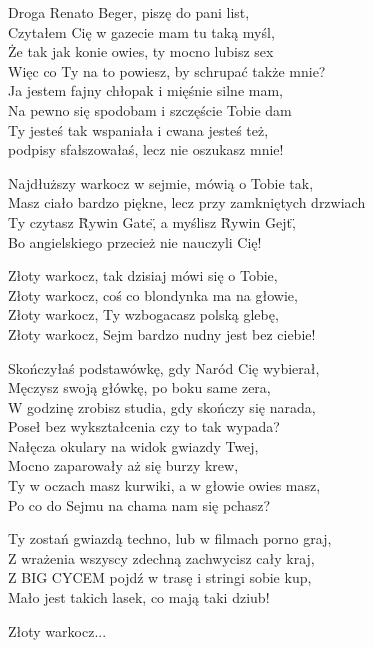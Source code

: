 \begin{text}
    \hfill\break
    Droga Renato Beger, piszę do pani list,\\
    Czytałem Cię w gazecie mam tu taką myśl,\\
    Że tak jak konie owies, ty mocno lubisz sex\\
    Więc co Ty na to powiesz, by schrupać także mnie?\\
    Ja jestem fajny chłopak i mięśnie silne mam,\\
    Na pewno się spodobam i szczęście Tobie dam\\
    Ty jesteś tak wspaniała i cwana jesteś też,\\
    podpisy sfałszowałaś, lecz nie oszukasz mnie!

    Najdłuższy warkocz w sejmie, mówią o Tobie tak,\\
    Masz ciało bardzo piękne, lecz przy zamkniętych drzwiach\\
    Ty czytasz \"Rywin Gate\", a myślisz \"Rywin Gejt\",\\
    Bo angielskiego przecież nie nauczyli Cię!

    \vin Złoty warkocz, tak dzisiaj mówi się o Tobie,\\
    \vin Złoty warkocz, coś co blondynka ma na głowie,\\
    \vin Złoty warkocz, Ty wzbogacasz polską glebę,\\
    \vin Złoty warkocz, Sejm bardzo nudny jest bez ciebie!

    Skończyłaś podstawówkę, gdy Naród Cię wybierał,\\
    Męczysz swoją główkę, po boku same zera,\\
    W godzinę zrobisz studia, gdy skończy się narada,\\
    Poseł bez wykształcenia czy to tak wypada?\\
    Nałęcza okulary na widok gwiazdy Twej,\\
    Mocno zaparowały aż się burzy krew,\\
    Ty w oczach masz kurwiki, a w głowie owies masz,\\
    Po co do Sejmu na chama nam się pchasz?

    Ty zostań gwiazdą techno, lub w filmach porno graj,\\
    Z wrażenia wszyscy zdechną zachwycisz cały kraj,\\
    Z BIG CYCEM pojdź w trasę i stringi sobie kup,\\
    Mało jest takich lasek, co mają taki dziub!

    \vin Złoty warkocz...

\end{text}
